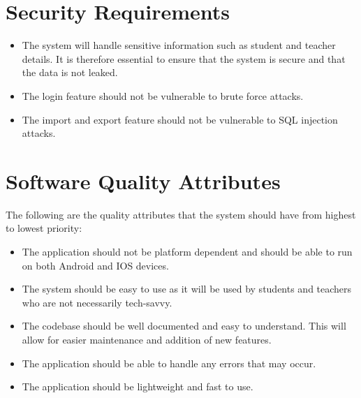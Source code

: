 \documentclass{scrreprt}
\begin{document}
\section{Security Requirements}
\begin{itemize}
    \item The system will handle sensitive information such as student and teacher details.
        It is therefore essential to ensure that the system is secure and that the data is not leaked.
    \item The login feature should not be vulnerable to brute force attacks.
    \item The import and export feature should not be vulnerable to SQL injection attacks.
\end{itemize}


\section{Software Quality Attributes}
The following are the quality attributes that the system should have from highest to lowest priority:
\begin{itemize}
    \item The application should not be platform dependent and should be able to run on both Android and IOS devices.
    \item The system should be easy to use as it will be used by students and teachers who are not necessarily tech-savvy.
    \item The codebase should be well documented and easy to understand. This will allow for easier maintenance and addition of new features.
    \item The application should be able to handle any errors that may occur.
    \item The application should be lightweight and fast to use.
\end{itemize}
\end{document}
